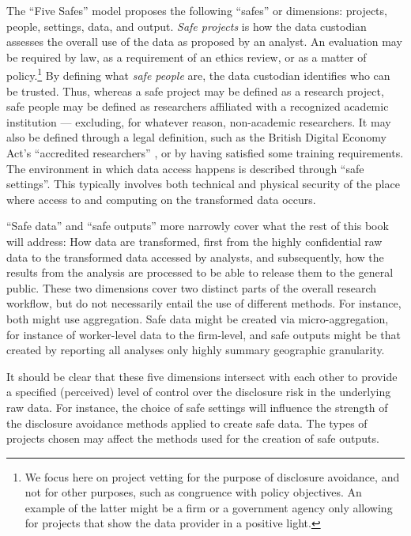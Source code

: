The ``Five Safes'' model proposes the following ``safes'' or dimensions:  projects,  people,  settings, data, and output. \textit{Safe projects} is how the data custodian assesses the overall use of the data as proposed by an analyst. An evaluation may be required by law, as a requirement of an ethics review, or as a matter of policy.\footnote{We focus here on project vetting for the purpose of disclosure avoidance, and not for other purposes, such as congruence with policy objectives. An example of the latter might be a firm or a government agency only allowing for projects that show the data provider in a positive light.} By defining what \textit{safe people} are, the data custodian identifies who can be trusted. Thus, whereas a safe project may be defined as a research project, safe people may be defined as researchers affiliated with a recognized academic institution --- excluding, for whatever reason, non-academic researchers. It may also be defined through a legal definition, such as the British Digital Economy Act's ``accredited researchers'' \cite{uk_government_digital_2020}, or by having satisfied some training requirements. 
The environment in which data access happens is described through ``safe settings''. This typically involves both technical and physical security of the place where access to and computing on the transformed data occurs. 

``Safe data'' and ``safe outputs'' more narrowly cover what the rest of this book will address: How data are transformed, first from the highly confidential raw data to the transformed data accessed by analysts, and subsequently, how the results from the analysis are processed to be able to release them to the general public. These two dimensions cover two distinct parts of the overall research workflow, but do not necessarily entail the use of different methods. For instance, both might use aggregation. Safe data might be created via micro-aggregation, for instance of worker-level data to the firm-level, and safe outputs might be that created by reporting all analyses only highly summary geographic granularity. 

It should be clear that these five dimensions intersect with each other to provide a specified (perceived) level of control over the disclosure risk in the underlying raw data. For instance, the choice of safe settings will influence the strength of the disclosure avoidance methods applied to create safe data. The types of projects chosen may affect the methods used for the creation of safe outputs. 


